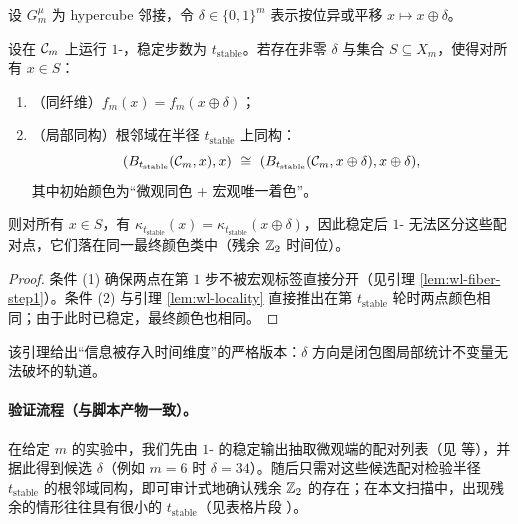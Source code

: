 设 $G_m^{\mu}$ 为 hypercube 邻接，令 $\delta\in\{0,1\}^{m}$ 表示按位异或平移 $x\mapsto x\oplus \delta$。

\begin{lemma}[Z2 残余的可审计充分条件]\label{lem:z2-sufficient}
设在 $\mathcal{C}_m$ 上运行 $1$-\WL{}，稳定步数为 $t_{\mathrm{stable}}$。若存在非零 $\delta$ 与集合 $S\subseteq X_m$，使得对所有 $x\in S$：
\begin{enumerate}
  \item （同纤维）$f_m(x)=f_m(x\oplus \delta)$；
  \item （局部同构）根邻域在半径 $t_{\mathrm{stable}}$ 上同构：
  \[
  (B_{t_{\mathrm{stable}}}(\Clo_m,x),x)\ \cong\ (B_{t_{\mathrm{stable}}}(\Clo_m,x\oplus\delta),x\oplus\delta),
  \]
  其中初始颜色为“微观同色 + 宏观唯一着色”。
\end{enumerate}
则对所有 $x\in S$，有 $\kappa_{t_{\mathrm{stable}}}(x)=\kappa_{t_{\mathrm{stable}}}(x\oplus\delta)$，因此稳定后 $1$-\WL{} 无法区分这些配对点，它们落在同一最终颜色类中（残余 $\mathbb{Z}_2$ 时间位）。
\end{lemma}

\begin{proof}
条件 (1) 确保两点在第 $1$ 步不被宏观标签直接分开（见引理 \ref{lem:wl-fiber-step1}）。条件 (2) 与引理 \ref{lem:wl-locality} 直接推出在第 $t_{\mathrm{stable}}$ 轮时两点颜色相同；由于此时已稳定，最终颜色也相同。
\end{proof}

\begin{remark}
该引理给出“信息被存入时间维度”的严格版本：$\delta$ 方向是闭包图局部统计不变量无法破坏的轨道。
\end{remark}

\paragraph{验证流程（与脚本产物一致）。}
在给定 $m$ 的实验中，我们先由 $1$-\WL{} 的稳定输出抽取微观端的配对列表（见  等），并据此得到候选 $\delta$（例如 $m=6$ 时 $\delta=34$）。随后只需对这些候选配对检验半径 $t_{\mathrm{stable}}$ 的根邻域同构，即可审计式地确认残余 \(\mathbb{Z}_2\) 的存在；在本文扫描中，出现残余的情形往往具有很小的 $t_{\mathrm{stable}}$（见表格片段 ）。

